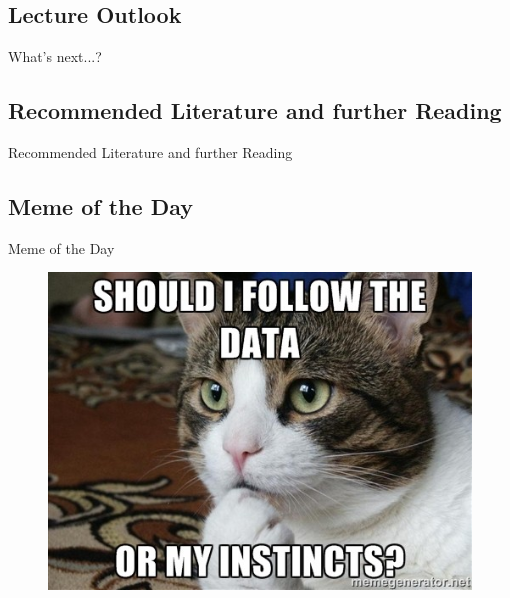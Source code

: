 \subsection{Lecture Outlook}

\begin{frame}{What's next...?}{}
\end{frame}


\subsection{Recommended Literature and further Reading}

\begin{frame}{Recommended Literature and further Reading}{}
	\footnotesize
	\begin{thebibliography}{2}

	\end{thebibliography}
\end{frame}


\subsection{Meme of the Day}

\begin{frame}{Meme of the Day}{}
	\begin{figure}
		\includegraphics[scale=0.35]{03_decision_theory/02_img/meme_of_the_day}
	\end{figure}
\end{frame}


\makethanks

